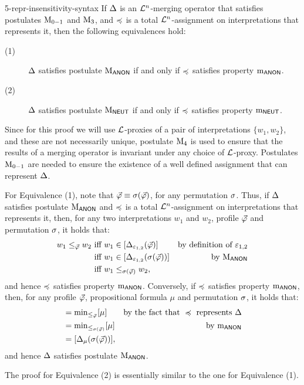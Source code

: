 \begin{thm}{}{5-repr-insensitivity-syntax}
	If $\me$ is an $\L^{n}$-merging operator that satisfies postulates $\ppm{0-1}$ and $\ppm{3}$,
	and $\as$ is a total $\L^n$-assignment on interpretations that represents it,
	then the following equivalences hold:
	\begin{description}
		\item[(1)] $\me$ satisfies postulate $\ppm{\ANON}$ if and only if $\as$ satisfies property $\oom{\ANON}$.
		\item[(2)] $\me$ satisfies postulate $\ppm{\NEUT}$ if and only if $\as$ satisfies property $\oom{\NEUT}$.
	\end{description}
\end{thm}
\begin{prf*}{}{}%
	Since for this proof we will use $\L$-proxies of a pair of interpretations $\{w_1,w_2\}$,
	and these are not necessarily unique, postulate $\ppm{4}$ is used to ensure that the results 
	of a merging operator is invariant under any choice of $\L$-proxy. 
	Postulates $\ppm{0-1}$ are needed to ensure the existence of a well defined assignment 
	that can represent $\me$.

	For Equivalence (1), note that $\P\equiv\perm(\P)$, for any permutation $\perm$.
	Thus, if $\me$ satisfies postulate $\ppm{\ANON}$ and $\as$ is a total $\L^n$-assignment on interpretations
	that represents it, then,
	for any two interpretations $w_1$ and $w_2$, profile $\P$
	and permutation $\perm$,
	it holds that:
	\begin{align*}
		w_1\le_{\P}w_2 &~\text{iff}~w_1\in [\me_{\px_{1,2}}(\P)] &\text{by definition of}~\px_{1,2}\\
					   &~\text{iff}~w_1\in [\me_{\px_{1,2}}(\perm(\P))] &\text{by}~\ppm{\ANON}\\
					   &~\text{iff}~w_1\le_{\perm(\P)}w_2,
	\end{align*}
	and hence $\as$ satisfies property $\oom{\ANON}$.
	Conversely, if $\as$ satisfies property $\oom{\ANON}$,
	then, for any profile $\P$, propositional formula $\mu$ and permutation $\perm$,
	it holds that:
	\begin{align*}
		[\me_{\mu}(\P)] &= \min_{\le_{\P}}[\mu] &\text{by the fact that}~\as~\text{represents}~\me\\
					   	&= \min_{\le_{\perm(\P)}}[\mu] &\text{by}~\oom{\ANON}\\
					    &= [\me_{\mu}(\perm(\P))],
	\end{align*}
	and hence $\me$ satisfies postulate $\ppm{\ANON}$.
	

	The proof for Equivalence (2) is essentially similar to the one for Equivalence (1).
\end{prf*}

